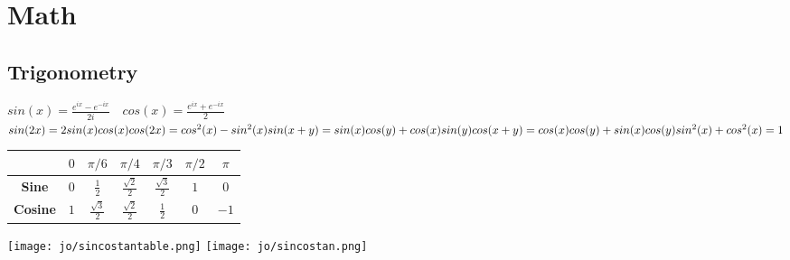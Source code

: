 \section*{Math}
\subsection*{Trigonometry}
$sin(x) = \frac{e^{ix} - e^{-ix}}{2i} \quad cos(x) = \frac{e^{ix} + e^{-ix}}{2}$ \\
$sin(2x) = 2sin(x)cos(x) \\ cos(2x) = cos^2(x) - sin^2(x) \\ sin(x+y) = sin(x)cos(y) + cos(x)sin(y) \\ cos(x+y) = cos(x)cos(y) + sin(x)cos(y) \\ sin^2(x) + cos^2(x) = 1$ \\
\begin{tabular}{|c|c|c|c|c|c|c|}
  \hline
  & $0$ & $\pi/6$ & $\pi/4$ & $\pi/3$ & $\pi/2$ & $\pi$ \\
  \hline
  \textbf{Sine} & $0$ & $\frac{1}{2}$ & $\frac{\sqrt{2}}{2}$ & $\frac{\sqrt{3}}{2}$ & $1$ & $0$ \\
  \hline
  \textbf{Cosine} & $1$ & $\frac{\sqrt{3}}{2}$ & $\frac{\sqrt{2}}{2}$ & $\frac{1}{2}$ & $0$ & $-1$ \\
  \hline
\end{tabular}
\texttt{[image: jo/sincostantable.png]}
\texttt{[image: jo/sincostan.png]}